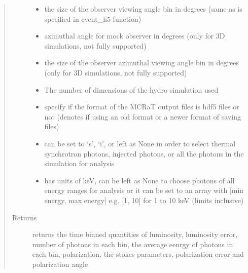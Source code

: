 \documentclass[letterpaper,10pt,english]{sphinxmanual}
\begin{document}
\begin{fulllineitems}
\begin{quote}
\begin{description}
\begin{itemize}
\item {} 
 \textendash{} the size of the observer viewing angle bin in degrees (same as is specified in event\_h5 function)

\item {} 
 \textendash{} azimuthal angle for mock observer in degrees (only for 3D simulations, not fully supported)

\item {} 
 \textendash{} the size of the observer azimuthal viewing angle bin in degrees (only for 3D simulations, not fully
supported)

\item {} 
 \textendash{} The number of dimensions of the hydro simulation used

\item {} 
 \textendash{} specify if the format of the MCRaT output files is hdf5 files or not (denotes if using an old format or
a newer format of saving files)

\item {} 
 \textendash{} can be set to ‘s’, ‘i’, or left as None in order to select thermal synchrotron photons, injected photons, or all the photons in the simulation for analysis

\item {} 
 \textendash{} has units of keV, can be left as None to choose photons of all energy ranges for analysis or it can be set to an array with {[}min energy, max energy{]} e.g. {[}1, 10{]} for 1 to 10 keV (limits inclusive)

\end{itemize}

\item[{Returns}] \leavevmode
returns the time binned quantities of luminosity, luminosity error, number of photons in each bin, the
average eenrgy of photons in each bin, polarization, the stokes parameters, polarization error and
polarization angle

\end{description}\end{quote}

\end{fulllineitems}
\end{document}
